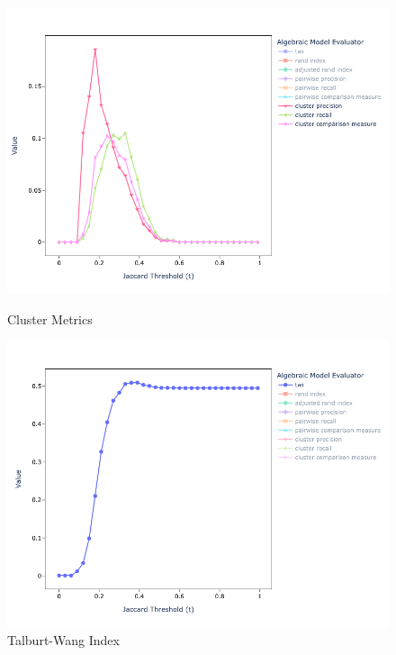 \documentclass[lettersize,journal]{IEEEtran}
\begin{document}
\begin{figure}[h!]
\begin{minipage}{0.49\textwidth}
            \centering
            \includegraphics[width=\textwidth]{full-alg-cp}
            \caption{Cluster Metrics}
            \label{fig:full-alg-cp}
        \end{minipage}    
        \begin{minipage}{0.49\textwidth}
            \centering
            \includegraphics[width=\textwidth]{full-alg-twi}
            \caption{Talburt-Wang Index}
            \label{fig:full-alf-twi}
        \end{minipage}    
        \begin{minipage}{0.49\textwidth}
            \centering

\end{minipage}
\end{figure}
\end{document}
